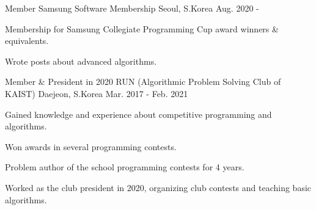

\begin{cventries}

\cventry
{Member} %
{Samsung Software Membership} %
{Seoul, S.Korea} %
{Aug. 2020 -} %
{
  \begin{cvitems} %
    \item {Membership for Samsung Collegiate Programming Cup award winners \& equivalents.}
    \item {Wrote posts about advanced algorithms.}
  \end{cvitems}
}

  \cventry
    {Member \& President in 2020} %
    {RUN (Algorithmic Problem Solving Club of KAIST)} %
    {Daejeon, S.Korea} %
    {Mar. 2017 - Feb. 2021} %
    {
      \begin{cvitems} %
        \item {Gained knowledge and experience about competitive programming and algorithms.}
        \item {Won awards in several programming contests.}
        \item {Problem author of the school programming contests for 4 years.}
        \item {Worked as the club president in 2020, organizing club contests and teaching basic algorithms.}
      \end{cvitems}
    }

\end{cventries}

